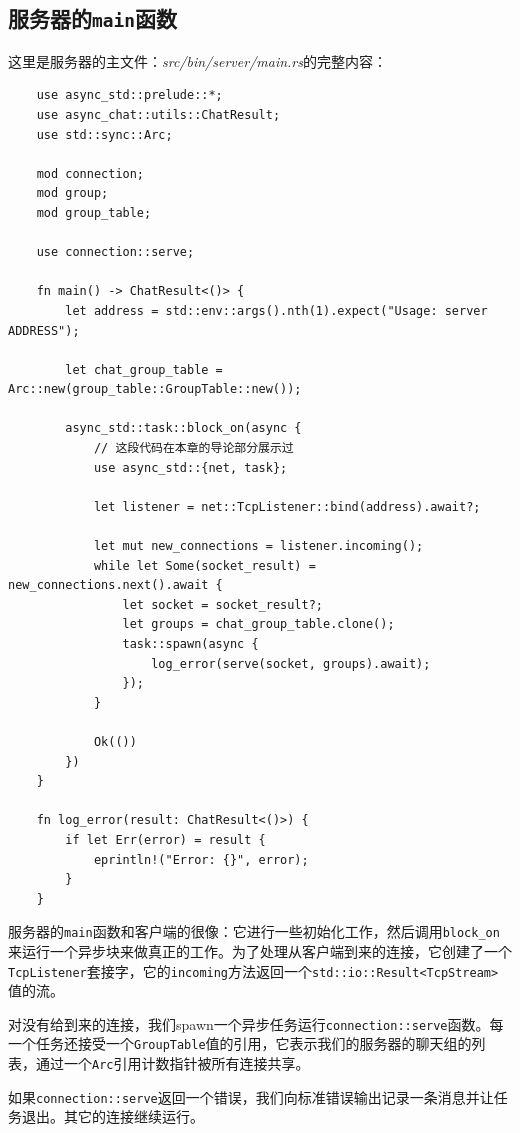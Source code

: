 \subsection{服务器的\texttt{main}函数}
这里是服务器的主文件：\emph{src/bin/server/main.rs}的完整内容：
\begin{verbatim}
    use async_std::prelude::*;
    use async_chat::utils::ChatResult;
    use std::sync::Arc;

    mod connection;
    mod group;
    mod group_table;

    use connection::serve;

    fn main() -> ChatResult<()> {
        let address = std::env::args().nth(1).expect("Usage: server ADDRESS");

        let chat_group_table = Arc::new(group_table::GroupTable::new());

        async_std::task::block_on(async {
            // 这段代码在本章的导论部分展示过
            use async_std::{net, task};
            
            let listener = net::TcpListener::bind(address).await?;

            let mut new_connections = listener.incoming();
            while let Some(socket_result) = new_connections.next().await {
                let socket = socket_result?;
                let groups = chat_group_table.clone();
                task::spawn(async {
                    log_error(serve(socket, groups).await);
                });
            }

            Ok(())
        })
    }

    fn log_error(result: ChatResult<()>) {
        if let Err(error) = result {
            eprintln!("Error: {}", error);
        }
    }
\end{verbatim}

服务器的\texttt{main}函数和客户端的很像：它进行一些初始化工作，然后调用\texttt{block\_on}来运行一个异步块来做真正的工作。为了处理从客户端到来的连接，它创建了一个\texttt{TcpListener}套接字，它的\texttt{incoming}方法返回一个\texttt{std::io::Result<TcpStream>}值的流。

对没有给到来的连接，我们spawn一个异步任务运行\texttt{connection::serve}函数。每一个任务还接受一个\texttt{GroupTable}值的引用，它表示我们的服务器的聊天组的列表，通过一个\texttt{Arc}引用计数指针被所有连接共享。

如果\texttt{connection::serve}返回一个错误，我们向标准错误输出记录一条消息并让任务退出。其它的连接继续运行。

